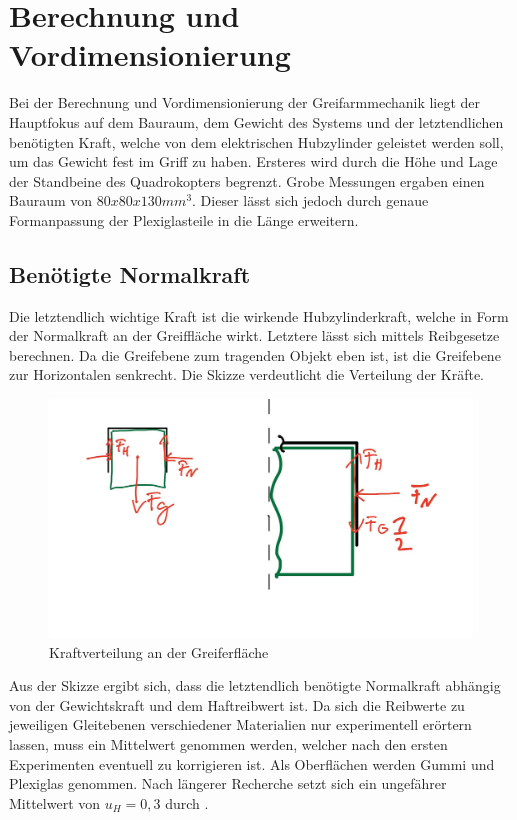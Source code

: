 \section{Berechnung und Vordimensionierung}
Bei der Berechnung und Vordimensionierung der Greifarmmechanik liegt der Hauptfokus auf dem Bauraum, dem Gewicht des Systems und der letztendlichen benötigten Kraft, welche von dem elektrischen Hubzylinder geleistet werden soll, um das Gewicht fest im Griff zu haben. Ersteres wird durch die Höhe und Lage der Standbeine des Quadrokopters begrenzt. Grobe Messungen ergaben einen Bauraum von $80 x 80 x 130 mm^3$. Dieser lässt sich jedoch durch genaue Formanpassung der Plexiglasteile in die Länge erweitern.

\subsection{Benötigte Normalkraft}

Die letztendlich wichtige Kraft ist die wirkende Hubzylinderkraft, welche in Form der Normalkraft an der Greiffläche wirkt. Letztere lässt sich mittels Reibgesetze berechnen. Da die Greifebene zum tragenden Objekt eben ist, ist die Greifebene zur Horizontalen senkrecht. Die Skizze verdeutlicht die Verteilung der Kräfte.

\begin{figure}
\begin{center}
\includegraphics[scale=0.5]{Grafiken/Greiferflaeche.jpg}
\caption{Kraftverteilung an der Greiferfläche}
\label{greiferfläche}
\end{center}
\end{figure}

Aus der Skizze ergibt sich, dass die letztendlich benötigte Normalkraft abhängig von der Gewichtskraft und dem Haftreibwert ist. Da sich die Reibwerte zu jeweiligen Gleitebenen verschiedener Materialien nur experimentell erörtern lassen, muss ein Mittelwert genommen werden, welcher nach den ersten Experimenten eventuell zu korrigieren ist. Als Oberflächen werden Gummi und Plexiglas genommen. Nach längerer Recherche setzt sich ein ungefährer Mittelwert von $u_H = 0,3$ durch \cite{Haftreibungszahl}.

